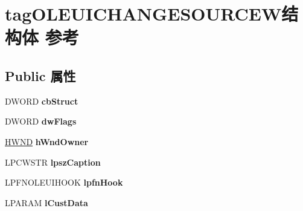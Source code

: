 \hypertarget{structtag_o_l_e_u_i_c_h_a_n_g_e_s_o_u_r_c_e_w}{}\section{tag\+O\+L\+E\+U\+I\+C\+H\+A\+N\+G\+E\+S\+O\+U\+R\+C\+E\+W结构体 参考}
\label{structtag_o_l_e_u_i_c_h_a_n_g_e_s_o_u_r_c_e_w}
\subsection*{Public 属性}
\begin{DoxyCompactItemize}
\item 
\mbox{\label{structtag_o_l_e_u_i_c_h_a_n_g_e_s_o_u_r_c_e_w_ae383a544215ab474ecc37659f72492ae}} 
D\+W\+O\+RD {\bfseries cb\+Struct}
\item 
\mbox{\label{structtag_o_l_e_u_i_c_h_a_n_g_e_s_o_u_r_c_e_w_af46ce6bb27d71fc91e7b72f9f2797c9a}} 
D\+W\+O\+RD {\bfseries dw\+Flags}
\item 
\mbox{\label{structtag_o_l_e_u_i_c_h_a_n_g_e_s_o_u_r_c_e_w_a1de10a74959f781c2642534537962def}} 
\hyperlink{interfacevoid}{H\+W\+ND} {\bfseries h\+Wnd\+Owner}
\item 
\mbox{\label{structtag_o_l_e_u_i_c_h_a_n_g_e_s_o_u_r_c_e_w_a2717f99f08190c3e84faf2de711104e1}} 
L\+P\+C\+W\+S\+TR {\bfseries lpsz\+Caption}
\item 
\mbox{\label{structtag_o_l_e_u_i_c_h_a_n_g_e_s_o_u_r_c_e_w_ad1eed4f3ae14bf67055cb72ec711ddf1}} 
L\+P\+F\+N\+O\+L\+E\+U\+I\+H\+O\+OK {\bfseries lpfn\+Hook}
\item 
\mbox{\label{structtag_o_l_e_u_i_c_h_a_n_g_e_s_o_u_r_c_e_w_a48316f10cdbb533a790b5d9a224fedc9}} 
L\+P\+A\+R\+AM {\bfseries l\+Cust\+Data}
\item 
\mbox{\label{structtag_o_l_e_u_i_c_h_a_n_g_e_s_o_u_r_c_e_w_aa31d2306483a2e97e1c323a34440fe4b}} 

\end{DoxyCompactItemize}
